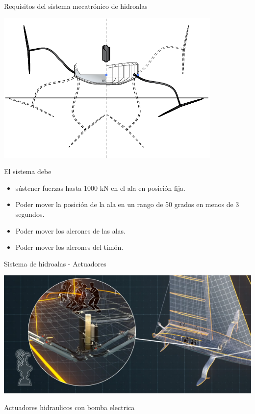 \documentclass[presentation,aspectratio=169]{beamer}
\begin{document}
\begin{frame}[label={sec:orgddd4473}]{Requisitos del sistema mecatrónico de hidroalas}
\begin{center}
\includegraphics[height=0.3\textheight]{../../figures/AC75-sketch.png}
\end{center}

El sistema debe
\begin{itemize}
\item sústener fuerzas hasta 1000 kN en el ala en posición fija.
\item Poder mover la posición de la ala en un rango de 50 grados en menos de 3 segundos.
\item Poder mover los alerones de las alas.
\item Poder mover los alerones del timón.
\end{itemize}
\end{frame}


\begin{frame}[label={sec:org508a29f}]{Sistema de hidroalas - Actuadores}

\begin{center}
\includegraphics[height=0.4\textheight]{../../figures/AC75-actuators.png}
\end{center}

Actuadores hidraulicos con bomba electrica
\end{frame}
\end{document}

